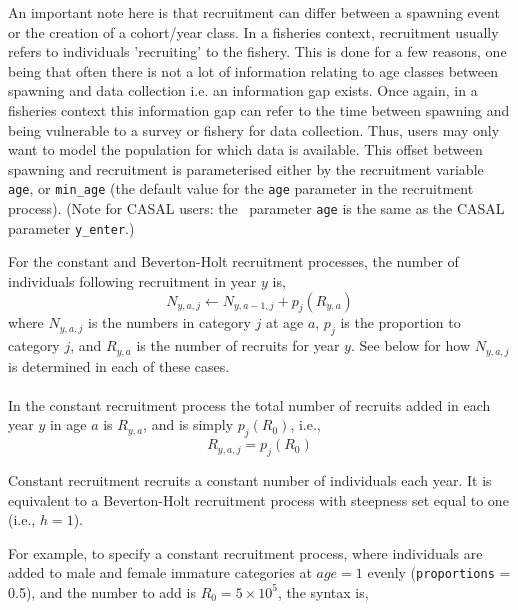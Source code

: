 An important note here is that recruitment can differ between a spawning event or the creation of a cohort/year class. In a fisheries context, recruitment usually refers to individuals 'recruiting' to the fishery. This is done for a few reasons, one being that often there is not a lot of information relating to age classes between spawning and data collection i.e. an information gap exists. Once again, in a fisheries context this information gap can refer to the time between spawning and being vulnerable to a survey or fishery for data collection. Thus, users may only want to model the population for which data is available. This offset between spawning and recruitment is parameterised either by the recruitment variable \texttt{age}, or \texttt{min\_age} (the default value for the \texttt{age} parameter in the recruitment process). (Note for CASAL users: the \CNAME\ parameter \texttt{age} is the same as the CASAL parameter \texttt{y\_enter}.)

For the constant and Beverton-Holt recruitment processes, the  number of individuals following recruitment in year $y$ is,
\begin{equation}
N_{y,a,j} \leftarrow N_{y,a - 1,j} + p_j(R_{y,a})
\end{equation}
where $N_{y,a,j}$ is the numbers in category $j$ at age $a$, $p_j$ is the proportion to category $j$, and $R_{y,a}$ is the number of recruits for year $y$. See below for how $N_{y,a,j}$ is determined in each of these cases.

\paragraph{}\label{subsubsec:constant-recruitment}

In the constant recruitment process the total number of recruits added in each year $y$ in age $a$ is $R_{y,a}$, and is simply $p_j(R_0)$, i.e.,
\begin{equation}
  R_{y,a,j} = p_j(R_0)
\end{equation}

Constant recruitment recruits a constant number of individuals each year. It is equivalent to a Beverton-Holt recruitment process with steepness set equal to one (i.e., $h=1$).

For example, to specify a constant recruitment process, where individuals are added to male and female immature categories at $age=1$ evenly (\texttt{proportions} = 0.5), and the number to add is $R_0=5 \times 10^5$, the syntax is,

